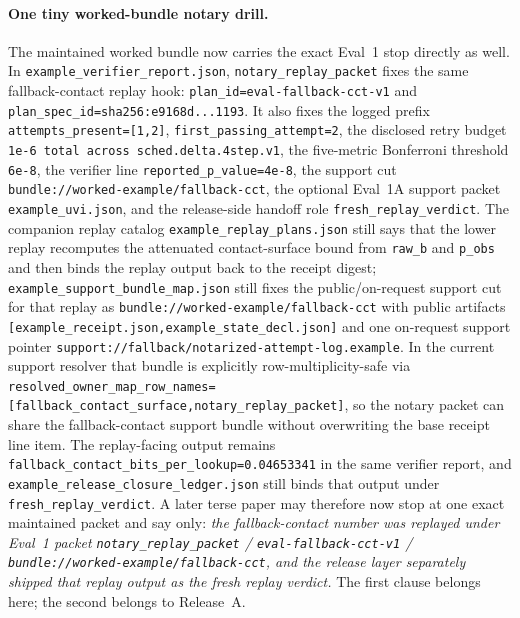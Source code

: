 \documentclass[11pt]{article}
\begin{document}
\paragraph{One tiny worked-bundle notary drill.}
The maintained worked bundle now carries the exact Eval~1 stop directly as well. In \nolinkurl{example_verifier_report.json}, \nolinkurl{notary_replay_packet} fixes the same fallback-contact replay hook: \nolinkurl{plan_id=eval-fallback-cct-v1} and \nolinkurl{plan_spec_id=sha256:e9168d...1193}. It also fixes the logged prefix \nolinkurl{attempts_present=[1,2]}, \nolinkurl{first_passing_attempt=2}, the disclosed retry budget \nolinkurl{1e-6 total across sched.delta.4step.v1}, the five-metric Bonferroni threshold \nolinkurl{6e-8}, the verifier line \nolinkurl{reported_p_value=4e-8}, the support cut \nolinkurl{bundle://worked-example/fallback-cct}, the optional Eval~1A support packet \nolinkurl{example_uvi.json}, and the release-side handoff role \nolinkurl{fresh_replay_verdict}. The companion replay catalog \nolinkurl{example_replay_plans.json} still says that the lower replay recomputes the attenuated contact-surface bound from \nolinkurl{raw_b} and \nolinkurl{p_obs} and then binds the replay output back to the receipt digest; \nolinkurl{example_support_bundle_map.json} still fixes the public/on-request support cut for that replay as \nolinkurl{bundle://worked-example/fallback-cct} with public artifacts \nolinkurl{[example_receipt.json,example_state_decl.json]} and one on-request support pointer \nolinkurl{support://fallback/notarized-attempt-log.example}. In the current support resolver that bundle is explicitly row-multiplicity-safe via \nolinkurl{resolved_owner_map_row_names=[fallback_contact_surface,notary_replay_packet]}, so the notary packet can share the fallback-contact support bundle without overwriting the base receipt line item. The replay-facing output remains \nolinkurl{fallback_contact_bits_per_lookup=0.04653341} in the same verifier report, and \nolinkurl{example_release_closure_ledger.json} still binds that output under \nolinkurl{fresh_replay_verdict}. A later terse paper may therefore now stop at one exact maintained packet and say only: \emph{the fallback-contact number was replayed under Eval~1 packet \nolinkurl{notary_replay_packet} / \nolinkurl{eval-fallback-cct-v1} / \nolinkurl{bundle://worked-example/fallback-cct}, and the release layer separately shipped that replay output as the fresh replay verdict.} The first clause belongs here; the second belongs to Release~A.
\end{document}
